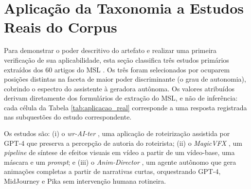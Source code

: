 \section{Aplicação da Taxonomia a Estudos Reais do Corpus}
\label{sec:tax:instanciacao}

Para demonstrar o poder descritivo do artefato e realizar uma primeira verificação de sua aplicabilidade, esta seção classifica três estudos primários extraídos dos 60 artigos do MSL \citep{RothAleo2026}. Os três foram selecionados por ocuparem posições distintas na faceta de maior poder discriminante (o grau de autonomia), cobrindo o espectro do assistente à geradora autônoma. Os valores atribuídos derivam diretamente dos formulários de extração do MSL, e não de inferência: cada célula da Tabela \ref{tab:aplicacao_real} corresponde a uma resposta registrada nas subquestões do estudo correspondente.

Os estudos são: (i) o \textit{wr-AI-ter} \citep{weber2024wraiter}, uma aplicação de roteirização assistida por GPT-4 que preserva a percepção de autoria do roteirista; (ii) o \textit{MagicVFX} \citep{guo2024magicvfx}, um \textit{pipeline} de síntese de efeitos visuais em vídeo a partir de um vídeo-base, uma máscara e um \textit{prompt}; e (iii) o \textit{Anim-Director} \citep{li2024animdirector}, um agente autônomo que gera animações completas a partir de narrativas curtas, orquestrando GPT-4, MidJourney e Pika sem intervenção humana rotineira.

